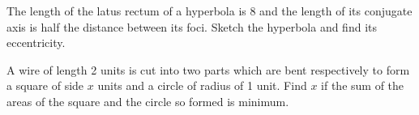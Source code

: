 \documentclass[journal,12pt,onecolumn]{IEEEtran}
\begin{document}
\begin{problem}
The length of the latus rectum of a hyperbola is 8 and the length of its conjugate axis is half the distance between its foci.  Sketch the hyperbola and find its eccentricity.
\end{problem}
\begin{problem}
A wire of length 2 units is cut into two parts which are bent respectively to form a square of side $x$ units and a circle of radius of 1 unit. Find $x$ if the sum of the areas of the square and the circle so formed is minimum.
\end{problem}
% 
%
% 

% 
\end{document}
